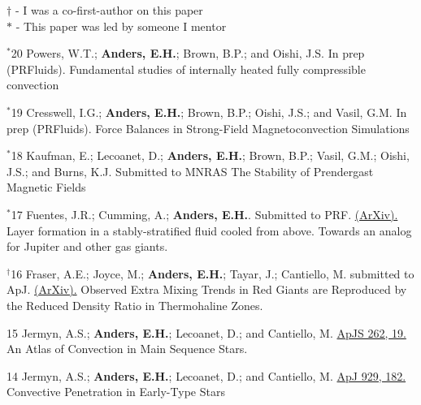 \newpage
{}
\hspace{\smallsephintwidth}$\dagger$ - I was a co-first-author on this paper \\
\hspace{\smallsephintwidth}$*$ - This paper was led by someone I mentor
\vspace{0.3cm}



      {$^*$20}
      {
        Powers, W.T.; \textbf{Anders, E.H.}; Brown, B.P.; and Oishi, J.S.
        In prep (PRFluids).\hspace{-0.5cm}
      }
      {Fundamental studies of internally heated fully compressible convection}

\cvpub{}
      {$^*$19}
      {
        Cresswell, I.G.; \textbf{Anders, E.H.}; Brown, B.P.; Oishi, J.S.; and Vasil, G.M.
        In prep (PRFluids). 
      }
      {Force Balances in Strong-Field Magnetoconvection Simulations}


\cvpub{}
      {$^*$18}
      {
        Kaufman, E.; Lecoanet, D.; \textbf{Anders, E.H.}; Brown, B.P.; Vasil, G.M.; Oishi, J.S.; and Burns, K.J. Submitted to MNRAS
      }
      {The Stability of Prendergast Magnetic Fields}

\cvpub{}
      {$^*$17}
      {
        Fuentes, J.R.; Cumming, A.; \textbf{Anders, E.H.}. Submitted to PRF.
        \href{https://arxiv.org/abs/2204.12643}{(ArXiv).}
      }
      {Layer formation in a stably-stratified fluid cooled from above. Towards an analog for Jupiter and other gas giants.}

\cvpub{}
      {$^\dagger$16}
      {
        Fraser, A.E.; Joyce, M.; \textbf{Anders, E.H.}; Tayar, J.; Cantiello, M. submitted to ApJ.
        \href{https://arxiv.org/abs/2204.08487}{(ArXiv).}
      }
      {Observed Extra Mixing Trends in Red Giants are Reproduced by the Reduced Density Ratio in Thermohaline Zones.}

\cvpub{}
	  {15}
	  {
		Jermyn, A.S.; \textbf{Anders, E.H.}; Lecoanet, D.; and Cantiello, M.
        \href{https://iopscience.iop.org/article/10.3847/1538-4365/ac7cee}{ApJS 262, 19.}
       }
	  {An Atlas of Convection in Main Sequence Stars.}

\cvpub{}
	  {14}
	  {
		Jermyn, A.S.; \textbf{Anders, E.H.}; Lecoanet, D.; and Cantiello, M. 
        \href{https://iopscience.iop.org/article/10.3847/1538-4357/ac5f08}{ApJ 929, 182.}
	  }
	  {Convective Penetration in Early-Type Stars}

